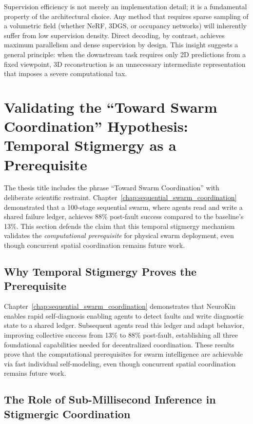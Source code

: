 \documentclass[12pt,a4paper,oneside]{report}
\begin{document}
Supervision efficiency is not merely an implementation detail; it is a fundamental property of the architectural choice. Any method that requires sparse sampling of a volumetric field (whether NeRF, 3DGS, or occupancy networks) will inherently suffer from low supervision density. Direct decoding, by contrast, achieves maximum parallelism and dense supervision by design. This insight suggests a general principle: when the downstream task requires only 2D predictions from a fixed viewpoint, 3D reconstruction is an unnecessary intermediate representation that imposes a severe computational tax.

\section{Validating the ``Toward Swarm Coordination'' Hypothesis: Temporal Stigmergy as a Prerequisite}

The thesis title includes the phrase ``Toward Swarm Coordination'' with deliberate scientific restraint. Chapter~\ref{chap:sequential_swarm_coordination} demonstrated that a 100-stage sequential swarm, where agents read and write a shared failure ledger, achieves 88\% post-fault success compared to the baseline's 13\%. This section defends the claim that this temporal stigmergy mechanism validates the \textit{computational prerequisite} for physical swarm deployment, even though concurrent spatial coordination remains future work.

\subsection{Why Temporal Stigmergy Proves the Prerequisite}

Chapter~\ref{chap:sequential_swarm_coordination} demonstrates that NeuroKin enables rapid self-diagnosis enabling agents to detect faults and write diagnostic state to a shared ledger. Subsequent agents read this ledger and adapt behavior, improving collective success from 13\% to 88\% post-fault, establishing all three foundational capabilities needed for decentralized coordination. These results prove that the computational prerequisites for swarm intelligence are achievable via fast individual self-modeling, even though concurrent spatial coordination remains future work.

\subsection{The Role of Sub-Millisecond Inference in Stigmergic Coordination}
\end{document}
